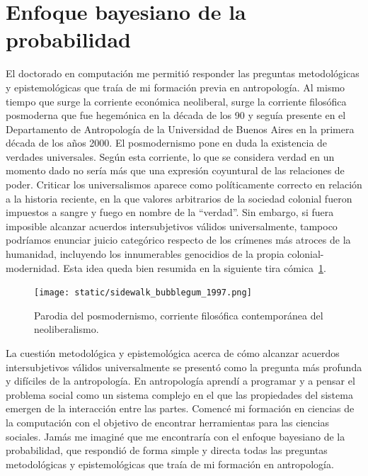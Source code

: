 \documentclass[a4paper,11pt]{book}
\theoremstyle{definition}
\begin{document}
\section{Enfoque bayesiano de la probabilidad}

El doctorado en computaci\'on me permiti\'o responder las preguntas metodol\'ogicas y epistemol\'ogicas que tra\'ia de mi formaci\'on previa en antropolog\'ia.
%
Al mismo tiempo que surge la corriente econ\'omica neoliberal, surge la corriente filos\'ofica posmoderna que fue hegem\'onica en la d\'ecada de los 90 y segu\'ia presente en el Departamento de Antropolog\'ia de la Universidad de Buenos Aires en la primera d\'ecada de los a\~nos 2000.
%
El posmodernismo pone en duda la existencia de verdades universales.
%
Seg\'un esta corriente, lo que se considera verdad en un momento dado no ser\'ia m\'as que una expresi\'on coyuntural de las relaciones de poder.
%
Criticar los universalismos aparece como pol\'iticamente correcto en relaci\'on a la historia reciente, en la que valores arbitrarios de la sociedad colonial fueron impuestos a sangre y fuego en nombre de la ``verdad''.
%
Sin embargo, si fuera imposible alcanzar acuerdos intersubjetivos v\'alidos universalmente, tampoco podr\'iamos enunciar juicio categ\'orico respecto de los cr\'imenes m\'as atroces de la humanidad, incluyendo los innumerables genocidios de la propia colonial-modernidad.
%
Esta idea queda bien resumida en la siguiente tira c\'omica~\ref{fig:sidewalk_bubblegum_1997}.


\begin{figure}[ht!]
\centering
\texttt{[image: static/sidewalk\_bubblegum\_1997.png]}
\caption{Parodia del posmodernismo, corriente filos\'ofica contempor\'anea del neoliberalismo.}
\label{fig:sidewalk_bubblegum_1997}
\end{figure}


La cuesti\'on metodol\'ogica y epistemol\'ogica acerca de c\'omo alcanzar acuerdos intersubjetivos v\'alidos universalmente se present\'o como la pregunta m\'as profunda y dif\'iciles de la antropolog\'ia.
%
En antropolog\'ia aprend\'i a programar y a pensar el problema social como un sistema complejo en el que las propiedades del sistema emergen de la interacci\'on entre las partes.
%
Comenc\'e mi formaci\'on en ciencias de la computaci\'on con el objetivo de encontrar herramientas para las ciencias sociales.
%
Jam\'as me imagin\'e que me encontrar\'ia con el enfoque bayesiano de la probabilidad, que respondi\'o de forma simple y directa todas las preguntas metodol\'ogicas y epistemol\'ogicas que tra\'ia de mi formaci\'on en antropolog\'ia.
\end{document}
